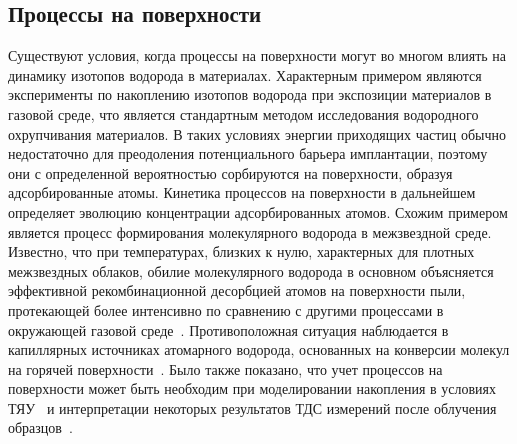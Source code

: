 \subsection{Процессы на поверхности}\label{subsec:ch1/sec4/subsec3}

Существуют условия, когда процессы на поверхности могут во многом влиять на динамику изотопов водорода в материалах. Характерным примером являются эксперименты по накоплению изотопов водорода при экспозиции материалов в газовой среде, что является стандартным методом исследования водородного охрупчивания материалов\cite{Briant2002,Louthan2008}. В таких условиях энергии приходящих частиц обычно недостаточно для преодоления потенциального барьера имплантации, поэтому они с определенной вероятностью сорбируются на поверхности, образуя адсорбированные атомы. Кинетика процессов на поверхности в дальнейшем определяет эволюцию концентрации адсорбированных атомов. Схожим примером является процесс формирования молекулярного водорода в межзвездной среде. Известно, что при температурах, близких к нулю, характерных для плотных межзвездных облаков, обилие молекулярного водорода в основном объясняется эффективной рекомбинационной десорбцией атомов на поверхности пыли, протекающей более интенсивно по сравнению с другими процессами в окружающей газовой среде~\cite{Katz1999, Perets2005, Hama2013}. Противоположная ситуация наблюдается в капиллярных источниках атомарного водорода, основанных на конверсии молекул на горячей поверхности~\cite{Tschersich2000, Tschersich2008}. Было также показано, что учет процессов на поверхности может быть необходим при моделировании накопления в условиях ТЯУ~\cite{Guterl2019} и интерпретации некоторых результатов ТДС измерений после облучения образцов~\cite{Hodille2017, Matveev2018}. 

